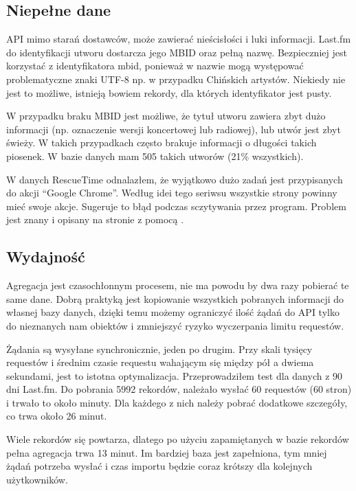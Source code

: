 \documentclass[openright]{xmgr}
\begin{document}
        \subsection*{Niepełne dane}
        API mimo starań dostawców, może zawierać nieścisłości i luki informacji.
        Last.fm do identyfikacji utworu dostarcza jego MBID oraz pełną nazwę.
        Bezpieczniej jest korzystać z identyfikatora mbid, ponieważ w nazwie mogą występować problematyczne znaki UTF-8 np. w przypadku Chińskich artystów.
        Niekiedy nie jest to możliwe, istnieją bowiem rekordy, dla których identyfikator jest pusty.

        W przypadku braku MBID jest możliwe,
        że tytuł utworu zawiera zbyt dużo informacji (np. oznaczenie wersji koncertowej lub radiowej),
        lub utwór jest zbyt świeży. W takich przypadkach często brakuje informacji o długości takich piosenek.
        W bazie danych mam 505 takich utworów (21\% wszystkich).

        W danych RescueTime odnalazłem, że wyjątkowo dużo zadań jest przypisanych do akcji ``Google Chrome''.
        Według idei tego seriwsu wszystkie strony powinny mieć swoje akcje. Sugeruje to błąd podczas sczytywania przez program.
        Problem jest znany i opisany na stronie z pomocą \cite{rescuetime:help-browser-time}.

        \subsection*{Wydajność}
        Agregacja jest czasochłonnym procesem, nie ma powodu by dwa razy pobierać te same dane.
        Dobrą praktyką jest kopiowanie wszystkich pobranych informacji do własnej bazy danych,
        dzięki temu możemy ograniczyć ilość żądań do API tylko do nieznanych nam obiektów i zmniejszyć ryzyko wyczerpania limitu requestów.

		Żądania są wysyłane synchronicznie, jeden po drugim.
		Przy skali tysięcy requestów i średnim czasie requestu wahającym się między pół a dwiema sekundami, jest to istotna optymalizacja.
		Przeprowadziłem test dla danych z 90 dni Last.fm. Do pobrania 5992 rekordów, należało wysłać 60 requestów (60 stron) i trwało to około minuty.
		Dla każdego z nich należy pobrać dodatkowe szczegóły, co trwa około 26 minut.

		Wiele rekordów się powtarza, dlatego po użyciu zapamiętanych w bazie rekordów pełna agregacja trwa 13 minut.
		Im bardziej baza jest zapełniona, tym mniej żądań potrzeba wysłać i czas importu będzie coraz krótszy dla kolejnych użytkowników.
\end{document}
